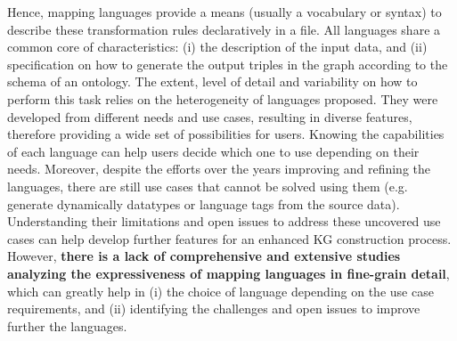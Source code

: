 
 Hence, mapping languages provide a means (usually a vocabulary or syntax) to describe these transformation rules declaratively in a file. 
 All languages share a common core of characteristics: (i) the description of the input data, and (ii) specification on how to generate the output triples in the graph according to the schema of an ontology. 
 The extent, level of detail and variability on how to perform this task relies on the heterogeneity of languages proposed. 
 They were developed from different needs and use cases, resulting in diverse features, therefore providing a wide set of possibilities for users.
 Knowing the capabilities of each language can help users decide which one to use depending on their needs. 
 Moreover, despite the efforts over the years improving and refining the languages, there are still use cases that cannot be solved using them (e.g. generate dynamically datatypes or language tags from the source data). Understanding their limitations and open issues to address these uncovered use cases can help develop further features for an enhanced KG construction process.
 However, \textbf{there is a lack of comprehensive and extensive studies analyzing the expressiveness of mapping languages in fine-grain detail}, which can greatly help in (i) the choice of language depending on the use case requirements, and (ii) identifying the challenges and open issues to improve further the languages. 
 


